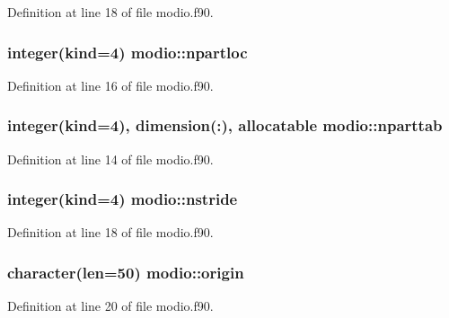 Definition at line 18 of file modio.\+f90.

\subsubsection[{\texorpdfstring{npartloc}{npartloc}}]{\setlength{\rightskip}{0pt plus 5cm}integer(kind=4) modio\+::npartloc}\hypertarget{namespacemodio_a0bf1df6ff1e675aabce26f3d7289a700}{}\label{namespacemodio_a0bf1df6ff1e675aabce26f3d7289a700}


Definition at line 16 of file modio.\+f90.

\subsubsection[{\texorpdfstring{nparttab}{nparttab}}]{\setlength{\rightskip}{0pt plus 5cm}integer(kind=4), dimension(\+:), allocatable modio\+::nparttab}\hypertarget{namespacemodio_a4a7b05300378789a7f94a217ba703153}{}\label{namespacemodio_a4a7b05300378789a7f94a217ba703153}


Definition at line 14 of file modio.\+f90.

\subsubsection[{\texorpdfstring{nstride}{nstride}}]{\setlength{\rightskip}{0pt plus 5cm}integer(kind=4) modio\+::nstride}\hypertarget{namespacemodio_a6661d8a6f911c13b15cebca52e76b6fc}{}\label{namespacemodio_a6661d8a6f911c13b15cebca52e76b6fc}


Definition at line 18 of file modio.\+f90.

\subsubsection[{\texorpdfstring{origin}{origin}}]{\setlength{\rightskip}{0pt plus 5cm}character(len=50) modio\+::origin}\hypertarget{namespacemodio_a12ada16137589f81ccc218e3b77f25c6}{}\label{namespacemodio_a12ada16137589f81ccc218e3b77f25c6}


Definition at line 20 of file modio.\+f90.

